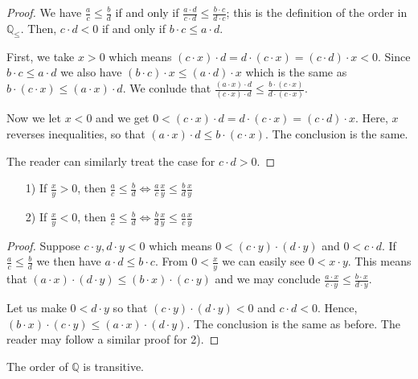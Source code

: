 \documentclass [12pt]{book}
\begin{document}
\begin{proof}We have $\frac ac\leq\frac bd$ if and only if $\frac{a\cdot d}{c\cdot d}\leq\frac{b\cdot c}{d\cdot c}$; this is the definition of the order in $\mathbb Q_{\leq}$. Then, $c\cdot d<0$ if and only if $b\cdot c\leq a\cdot d$. 

First, we take $x>0$ which means $(c\cdot x)\cdot d=d\cdot(c\cdot x)=(c\cdot d)\cdot x<0$. Since $b\cdot c\leq a\cdot d$ we also have $(b\cdot c)\cdot x\leq(a\cdot d)\cdot x$ which is the same as $b\cdot (c\cdot x)\leq(a\cdot x)\cdot d$. We conlude that $\frac{(a\cdot x)\cdot d}{(c\cdot x)\cdot d}\leq\frac{b\cdot(c\cdot x)}{d\cdot(c\cdot x)}$.

Now we let $x<0$ and we get $0<(c\cdot x)\cdot d=d\cdot(c\cdot x)=(c\cdot d)\cdot x$. Here, $x$ reverses inequalities, so that $(a\cdot x)\cdot d\leq b\cdot(c\cdot x)$. The conclusion is the same.

The reader can similarly treat the case for $c\cdot d>0$.\end{proof}

\begin{proposition}\makebox[5pt][]{}\mbox {}\begin{itemize}\item[1)]If $\frac xy>0$, then $\frac ac\leq\frac bd\Longleftrightarrow\frac ac\frac xy\leq\frac bd\frac xy$\item[2)]If $\frac xy<0$, then $\frac ac\leq\frac bd\Longleftrightarrow\frac bd\frac xy\leq\frac ac\frac xy$\end{itemize}\end{proposition}

\begin{proof}Suppose $c\cdot y,d\cdot y<0$ which means $0<(c\cdot y)\cdot(d\cdot y)$ and $0<c\cdot d$. If $\frac ac\leq\frac bd$ we then have $a\cdot d\leq b\cdot c$. From $0<\frac xy$ we can easily see $0<x\cdot y$. This means that $(a\cdot x)\cdot(d\cdot y)\leq(b\cdot x)\cdot(c\cdot y)$ and we may conclude $\frac{a\cdot x}{c\cdot y}\leq\frac{b\cdot x}{d\cdot y}$.

Let us make $0<d\cdot y$ so that $(c\cdot y)\cdot(d\cdot y)<0$ and $c\cdot d<0$. Hence, $(b\cdot x)\cdot(c\cdot y)\leq(a\cdot x)\cdot(d\cdot y)$. The conclusion is the same as before. The reader may follow a similar proof for 2).\end{proof}

\begin{proposition}The order of $\mathbb Q$ is transitive.\end{proposition}
\end{document}
